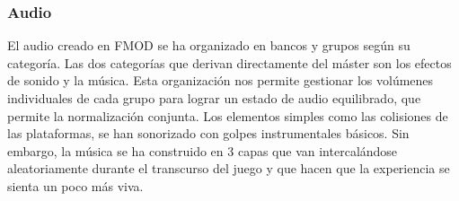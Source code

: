 \subsubsection{Audio}

El audio creado en FMOD se ha organizado en bancos y grupos según su categoría. Las dos categorías que derivan directamente del máster son los efectos de sonido y la música. Esta organización nos permite gestionar los volúmenes individuales de cada grupo para lograr un estado de audio equilibrado, que permite la normalización conjunta. Los elementos simples como las colisiones de las plataformas, se han sonorizado con golpes instrumentales básicos. Sin embargo, la música se ha construido en 3 capas que van intercalándose aleatoriamente durante el transcurso del juego y que hacen que la experiencia se sienta un poco más viva.